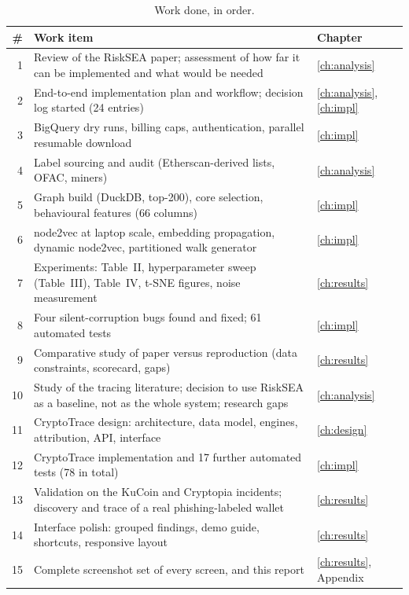 \begin{table}[H]
\centering\small\singlespacing
\begin{tabular}{r p{8.4cm} p{3.4cm}}
\toprule
\textbf{\#} & \textbf{Work item} & \textbf{Chapter}\\
\midrule
1 & Review of the RiskSEA paper; assessment of how far it can be implemented and what would be needed & \ref{ch:analysis}\\
2 & End-to-end implementation plan and workflow; decision log started (24 entries) & \ref{ch:analysis}, \ref{ch:impl}\\
3 & BigQuery dry runs, billing caps, authentication, parallel resumable download & \ref{ch:impl}\\
4 & Label sourcing and audit (Etherscan-derived lists, OFAC, miners) & \ref{ch:analysis}\\
5 & Graph build (DuckDB, top-200), core selection, behavioural features (66 columns) & \ref{ch:impl}\\
6 & node2vec at laptop scale, embedding propagation, dynamic node2vec, partitioned walk generator & \ref{ch:impl}\\
7 & Experiments: Table~II, hyperparameter sweep (Table~III), Table~IV, t-SNE figures, noise measurement & \ref{ch:results}\\
8 & Four silent-corruption bugs found and fixed; 61 automated tests & \ref{ch:impl}\\
9 & Comparative study of paper versus reproduction (data constraints, scorecard, gaps) & \ref{ch:results}\\
10 & Study of the tracing literature; decision to use RiskSEA as a baseline, not as the whole system; research gaps & \ref{ch:analysis}\\
11 & CryptoTrace design: architecture, data model, engines, attribution, API, interface & \ref{ch:design}\\
12 & CryptoTrace implementation and 17 further automated tests (78 in total) & \ref{ch:impl}\\
13 & Validation on the KuCoin and Cryptopia incidents; discovery and trace of a real phishing-labeled wallet & \ref{ch:results}\\
14 & Interface polish: grouped findings, demo guide, shortcuts, responsive layout & \ref{ch:results}\\
15 & Complete screenshot set of every screen, and this report & \ref{ch:results}, Appendix\\
\bottomrule
\end{tabular}
\caption{Work done, in order.}
\label{tab:workdone}
\end{table}

